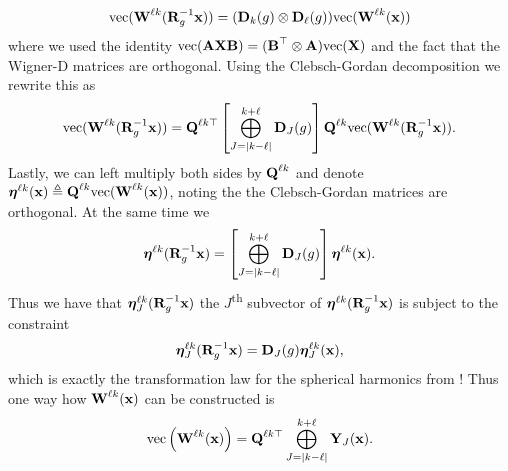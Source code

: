 \begin{align}
    \text{vec}(\textbf{W}^{\ell k}(\textbf{R}_g^{-1}\textbf{x})) = (\textbf{D}_k(g) \otimes \textbf{D}_\ell(g)) \text{vec}(\textbf{W}^{\ell k}(\textbf{x}))
\end{align}
where we used the identity $\text{vec}(\textbf{AXB}) = (\textbf{B}^\top \otimes \textbf{A})\text{vec}(\textbf{X})$ and the fact that the Wigner-D matrices are orthogonal. Using the Clebsch-Gordan decomposition we rewrite this as
\begin{align}
    \text{vec}(\textbf{W}^{\ell k}(\textbf{R}_g^{-1}\textbf{x}))  = \textbf{Q}^{\ell k\top} \left [ \bigoplus_{J = |k - \ell|}^{k + \ell} \textbf{D}_J(g) \right ] \textbf{Q}^{\ell k} \text{vec}(\textbf{W}^{\ell k}(\textbf{R}_g^{-1}\textbf{x})) .
\end{align}
Lastly, we can left multiply both sides by $\textbf{Q}^{\ell k}$ and denote $\bm{\eta}^{\ell k}(\textbf{x}) \triangleq \textbf{Q}^{\ell k} \text{vec}(\textbf{W}^{\ell k}(\textbf{x}))$, noting the the Clebsch-Gordan matrices are orthogonal. At the same time we 
\begin{align}
    \bm{\eta}^{\ell k}(\textbf{R}_g^{-1}\textbf{x}) =  \left [ \bigoplus_{J = |k - \ell|}^{k + \ell} \textbf{D}_J(g) \right ] \bm{\eta}^{\ell k}(\textbf{x}).
\end{align}
Thus we have that $\bm{\eta}^{\ell k}_J(\textbf{R}_g^{-1}\textbf{x})$ the $J$\textsuperscript{th} subvector of $\bm{\eta}^{\ell k}(\textbf{R}_g^{-1}\textbf{x})$ is subject to the constraint
\begin{align}
    \bm{\eta}_J^{\ell k}(\textbf{R}_g^{-1}\textbf{x}) =  \textbf{D}_J(g) \bm{\eta}_J^{\ell k}(\textbf{x}),
\end{align}
which is exactly the transformation law for the spherical harmonics from ! Thus one way how $\textbf{W}^{\ell k}(\textbf{x})$ can be constructed is
\begin{align}
    \text{vec} \left ( \textbf{W}^{\ell k}(\textbf{x}) \right ) = \textbf{Q}^{\ell k \top} \bigoplus_{J = |k - \ell|}^{k + \ell} \textbf{Y}_J(\textbf{x}).
\end{align}



